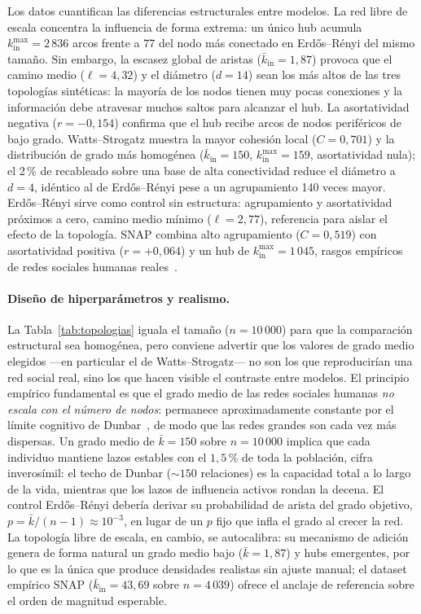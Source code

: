 Los datos cuantifican las diferencias estructurales entre modelos. La red libre de escala concentra la influencia de forma extrema: un único hub acumula $k_{\mathrm{in}}^{\max} = 2\,836$ arcos frente a $77$ del nodo más conectado en Erdős–Rényi del mismo tamaño. Sin embargo, la escasez global de aristas ($\bar{k}_{\mathrm{in}} = 1{,}87$) provoca que el camino medio ($\ell = 4{,}32$) y el diámetro ($d = 14$) sean los más altos de las tres topologías sintéticas: la mayoría de los nodos tienen muy pocas conexiones y la información debe atravesar muchos saltos para alcanzar el hub. La asortatividad negativa ($r = -0{,}154$) confirma que el hub recibe arcos de nodos periféricos de bajo grado. Watts–Strogatz muestra la mayor cohesión local ($C = 0{,}701$) y la distribución de grado más homogénea ($\bar{k}_{\mathrm{in}} = 150$, $k_{\mathrm{in}}^{\max} = 159$, asortatividad nula); el 2\,\% de recableado sobre una base de alta conectividad reduce el diámetro a $d = 4$, idéntico al de Erdős–Rényi pese a un agrupamiento 140 veces mayor. Erdős–Rényi sirve como control sin estructura: agrupamiento y asortatividad próximos a cero, camino medio mínimo ($\ell = 2{,}77$), referencia para aislar el efecto de la topología. SNAP combina alto agrupamiento ($C = 0{,}519$) con asortatividad positiva ($r = +0{,}064$) y un hub de $k_{\mathrm{in}}^{\max} = 1\,045$, rasgos empíricos de redes sociales humanas reales~\cite{Newman2003}.

\paragraph{Diseño de hiperparámetros y realismo.}
La Tabla~\ref{tab:topologias} iguala el tamaño ($n = 10\,000$) para que la comparación estructural sea homogénea, pero conviene advertir que los valores de grado medio elegidos —en particular el de Watts–Strogatz— no son los que reproducirían una red social real, sino los que hacen visible el contraste entre modelos. El principio empírico fundamental es que el grado medio de las redes sociales humanas \emph{no escala con el número de nodos}: permanece aproximadamente constante por el límite cognitivo de Dunbar~\cite{Dunbar1992}, de modo que las redes grandes son cada vez más dispersas. Un grado medio de $\bar{k}=150$ sobre $n=10\,000$ implica que cada individuo mantiene lazos estables con el $1{,}5$\,\% de toda la población, cifra inverosímil: el techo de Dunbar ($\sim 150$ relaciones) es la capacidad total a lo largo de la vida, mientras que los lazos de influencia activos rondan la decena. El control Erdős–Rényi debería derivar su probabilidad de arista del grado objetivo, $p = \bar{k}/(n-1) \approx 10^{-3}$, en lugar de un $p$ fijo que infla el grado al crecer la red. La topología libre de escala, en cambio, se autocalibra: su mecanismo de adición genera de forma natural un grado medio bajo ($\bar{k} = 1{,}87$) y hubs emergentes, por lo que es la única que produce densidades realistas sin ajuste manual; el dataset empírico SNAP ($\bar{k}_{\mathrm{in}} = 43{,}69$ sobre $n = 4\,039$) ofrece el anclaje de referencia sobre el orden de magnitud esperable.

